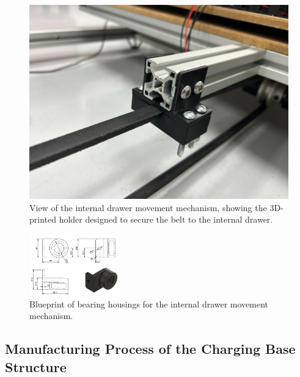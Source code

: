 \begin{figure}[H]
\begin{minipage}{0.49\textwidth}
        \label{fig:imagen2}
    \end{minipage}%
    \hfill
    \begin{minipage}{0.49\textwidth}
        \centering
        \includegraphics[width=\textwidth]{MECANISMO/MECANISMO_AGARRE.jpg}
        \caption{View of the internal drawer movement mechanism, showing the 3D-printed holder designed to secure the belt to the internal drawer.}
        \label{fig:imagen1}
    \end{minipage}%
    \hfill
\end{figure}

\begin{figure}[H]
    \centering
    \includegraphics[width=0.35\textwidth]{PLANOS/PLANO_CHUMACERA.png}
    \caption{Blueprint of bearing housings for the internal drawer movement mechanism.}
    \label{fig:etiqueta}
\end{figure}


\subsection{Manufacturing Process of the Charging Base Structure}

